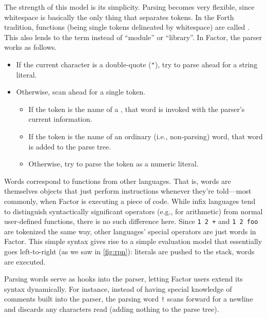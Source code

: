 The strength of this model is its simplicity.  Parsing becomes very flexible,
since whitespace is basically the only thing that separates tokens.  In the
Forth tradition, functions (being single tokens delineated by whitespace) are
called .  This also lends to the term  instead of
``module'' or ``library''.   In Factor, the parser works as follows.
\begin{itemize}
  \item If the current character is a double-quote (\lstinline|"|), try to
        parse ahead for a string literal.
  \item Otherwise, scan ahead for a single token.
        \begin{itemize}
          \item If the token is the name of a , that word is
                invoked with the parser's current information.
          \item If the token is the name of an ordinary (i.e., non-parsing)
                word, that word is added to the parse tree.
          \item Otherwise, try to parse the token as a numeric literal.
        \end{itemize}
\end{itemize}

Words correspond to  functions from other languages.  That
is, words are themselves objects that just perform instructions whenever
they're told---most commonly, when Factor is executing a piece of code.  While
infix languages tend to distinguish syntactically significant operators (e.g.,
for arithmetic) from normal user-defined functions, there is no such difference
here.  Since \lstinline|1 2 +| and \lstinline|1 2 foo| are tokenized the same
way, other languages' special operators are just words in Factor.  This simple
syntax gives rise to a simple evaluation model that essentially goes
left-to-right (as we saw in \vref{fig:rpn}): literals are pushed to the stack,
words are executed.


Parsing words serve as hooks into the parser, letting Factor users extend its
syntax dynamically.  For instance, instead of having special knowledge of
comments built into the parser, the parsing word \lstinline|!| scans forward
for a newline and discards any characters read (adding nothing to the parse
tree).

